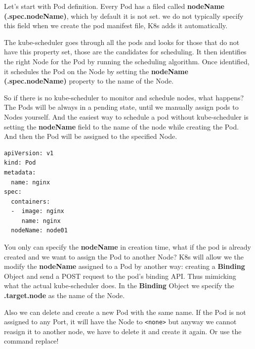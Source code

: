 \documentclass{article}
\newenvironment{blocktemplate}[1]{%
    \tcolorbox[beamer,%
    noparskip,breakable,
    colframe=Blue,%
    colbacklower=LimeGreen!75!LightGreen,%
    title=#1]}%
    {\endtcolorbox}
\newenvironment{codetemplate}[1][]{%
  \mybasecolorbox[#1]
  \itshape
}{%
  \endmybasecolorbox
}
\begin{document}
Let's start with Pod definition. Every Pod has a filed called \textbf{nodeName (.spec.nodeName)}, which by default it is not set. we do not typically specify this field when we create the pod manifest file, K8s adds it automatically. 

The kube-scheduler goes through all the pods and looks for those that do not have this property set, those are the candidates for scheduling. It then identifies the right Node for the Pod by running the scheduling algorithm. Once identified, it schedules the Pod on the Node by setting the \textbf{nodeName (.spec.nodeName)} property to the name of the Node. 

So if there is no kube-scheduler to monitor and schedule nodes, what happens? The Pods will be always in a pending state, until we manually assign pods to Nodes yourself. And the easiest way to schedule a pod without kube-scheduler is setting the \textbf{nodeName} field to the name of the node while creating the Pod. And then the Pod will be assigned to the specified Node. 

\begin{codetemplate}{}
\begin{verbatim}
apiVersion: v1
kind: Pod
metadata:
  name: nginx
spec:
  containers:
  -  image: nginx
     name: nginx
  nodeName: node01
\end{verbatim}
\end{codetemplate}

You only can specify the \textbf{nodeName} in creation time, what if the pod is already created and we want to assign the Pod to another Node? K8s will allow we the modify the \textbf{nodeName} assigned to a Pod by another way: creating a \textbf{Binding} Object and send a POST request to the pod's binding API. Thus mimicking what the actual kube-scheduler does. In the \textbf{Binding} Object we specify the \textbf{.target.node} as the name of the Node.

\begin{blocktemplate}{NOTE:}
Also we can delete and create a new Pod with the same name. If the Pod is not assigned to any Port, it will have the Node to \verb|<none>| but anyway we cannot reasign it to another node, we have to delete it and create it again. Or use the command replace!
\end{blocktemplate}
\end{document}
